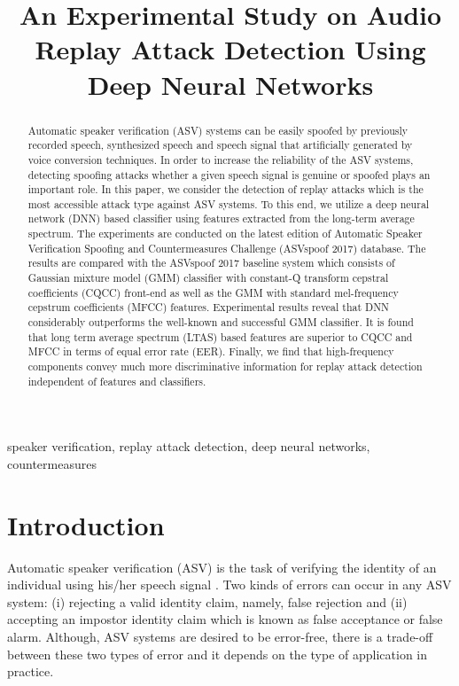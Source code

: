 \documentclass{article}
\title{An Experimental Study on Audio Replay Attack Detection Using Deep Neural Networks}
\begin{document}
\maketitle

\begin{abstract}
    \label{abstract}
    Automatic speaker verification (ASV) systems can be easily spoofed by previously recorded speech, synthesized
    speech and speech signal that artificially generated by voice conversion techniques. In order to increase the
    reliability of the ASV systems, detecting spoofing attacks whether a given speech signal is genuine or spoofed
    plays an important role. In this paper, we consider the detection of replay attacks which is the most accessible
    attack type against ASV systems. To this end, we utilize a deep neural network (DNN) based classifier using
    features extracted from the long-term average spectrum. The experiments are conducted on the latest edition of
    Automatic Speaker Verification Spoofing and Countermeasures Challenge (ASVspoof 2017) database. The results are
    compared with the ASVspoof 2017 baseline system which consists of Gaussian mixture model (GMM) classifier with
    constant-Q transform cepstral coefficients (CQCC) front-end as well as the GMM with standard mel-frequency cepstrum
    coefficients (MFCC) features. Experimental results reveal that DNN considerably outperforms the well-known and
    successful GMM classifier. It is found that long term average spectrum (LTAS) based features are superior to CQCC
    and MFCC in terms of equal error rate (EER). Finally, we find that high-frequency components convey much more
    discriminative information for replay attack detection independent of features and classifiers.
\end{abstract}

\begin{keywords}
    speaker verification, replay attack detection, deep neural networks, countermeasures
\end{keywords}

\section{Introduction}
\label{sec:intro}
Automatic speaker verification (ASV) is the task of verifying the identity of an individual using his/her speech
signal \cite{kinnunen2010overview}. Two kinds of errors can occur in any ASV system: (i) rejecting a valid identity
claim, namely, false rejection and (ii) accepting an impostor identity claim which is known as false acceptance or
false alarm. Although, ASV systems are desired to be error-free, there is a trade-off between these two types of error
and it depends on the type of application in practice.
\end{document}
